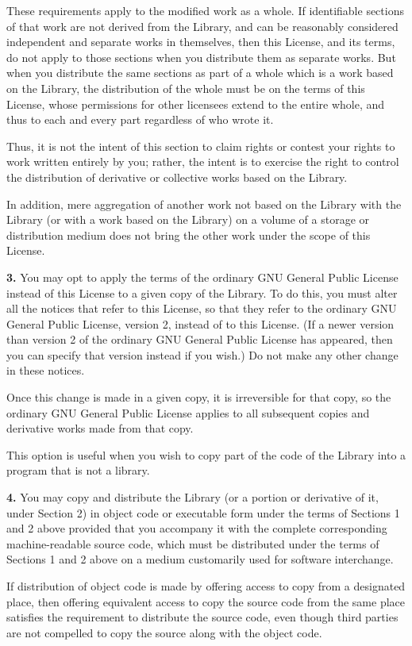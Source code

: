 \documentclass[]{article}
\begin{document}
These requirements apply to the modified work as a whole. If
identifiable sections of that work are not derived from the Library, and
can be reasonably considered independent and separate works in
themselves, then this License, and its terms, do not apply to those
sections when you distribute them as separate works. But when you
distribute the same sections as part of a whole which is a work based on
the Library, the distribution of the whole must be on the terms of this
License, whose permissions for other licensees extend to the entire
whole, and thus to each and every part regardless of who wrote it.

Thus, it is not the intent of this section to claim rights or contest
your rights to work written entirely by you; rather, the intent is to
exercise the right to control the distribution of derivative or
collective works based on the Library.

In addition, mere aggregation of another work not based on the Library
with the Library (or with a work based on the Library) on a volume of a
storage or distribution medium does not bring the other work under the
scope of this License.

\textbf{3.} You may opt to apply the terms of the ordinary GNU General
Public License instead of this License to a given copy of the Library.
To do this, you must alter all the notices that refer to this License,
so that they refer to the ordinary GNU General Public License, version
2, instead of to this License. (If a newer version than version 2 of the
ordinary GNU General Public License has appeared, then you can specify
that version instead if you wish.) Do not make any other change in these
notices.

Once this change is made in a given copy, it is irreversible for that
copy, so the ordinary GNU General Public License applies to all
subsequent copies and derivative works made from that copy.

This option is useful when you wish to copy part of the code of the
Library into a program that is not a library.

\textbf{4.} You may copy and distribute the Library (or a portion or
derivative of it, under Section 2) in object code or executable form
under the terms of Sections 1 and 2 above provided that you accompany it
with the complete corresponding machine-readable source code, which must
be distributed under the terms of Sections 1 and 2 above on a medium
customarily used for software interchange.

If distribution of object code is made by offering access to copy from a
designated place, then offering equivalent access to copy the source
code from the same place satisfies the requirement to distribute the
source code, even though third parties are not compelled to copy the
source along with the object code.
\end{document}
